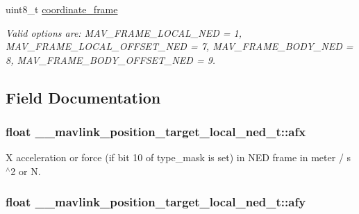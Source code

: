 \begin{DoxyCompactItemize}
uint8\+\_\+t \hyperlink{struct____mavlink__position__target__local__ned__t_a8db581d33f76e8a961934b48cbee7316}{coordinate\+\_\+frame}
\begin{DoxyCompactList}\small\item\em Valid options are\+: M\+A\+V\+\_\+\+F\+R\+A\+M\+E\+\_\+\+L\+O\+C\+A\+L\+\_\+\+N\+E\+D = 1, M\+A\+V\+\_\+\+F\+R\+A\+M\+E\+\_\+\+L\+O\+C\+A\+L\+\_\+\+O\+F\+F\+S\+E\+T\+\_\+\+N\+E\+D = 7, M\+A\+V\+\_\+\+F\+R\+A\+M\+E\+\_\+\+B\+O\+D\+Y\+\_\+\+N\+E\+D = 8, M\+A\+V\+\_\+\+F\+R\+A\+M\+E\+\_\+\+B\+O\+D\+Y\+\_\+\+O\+F\+F\+S\+E\+T\+\_\+\+N\+E\+D = 9. \end{DoxyCompactList}\end{DoxyCompactItemize}


\subsection{Field Documentation}
\hypertarget{struct____mavlink__position__target__local__ned__t_a254274f9dda96c07e4c5a237f0f67609}{
\subsubsection[{afx}]{\setlength{\rightskip}{0pt plus 5cm}float \+\_\+\+\_\+mavlink\+\_\+position\+\_\+target\+\_\+local\+\_\+ned\+\_\+t\+::afx}}\label{struct____mavlink__position__target__local__ned__t_a254274f9dda96c07e4c5a237f0f67609}


X acceleration or force (if bit 10 of type\+\_\+mask is set) in N\+E\+D frame in meter / s$^\wedge$2 or N. 

\hypertarget{struct____mavlink__position__target__local__ned__t_a371a31bdc0b84e00766b108abd53f09f}{
\subsubsection[{afy}]{\setlength{\rightskip}{0pt plus 5cm}float \+\_\+\+\_\+mavlink\+\_\+position\+\_\+target\+\_\+local\+\_\+ned\+\_\+t\+::afy}}\label{struct____mavlink__position__target__local__ned__t_a371a31bdc0b84e00766b108abd53f09f}


